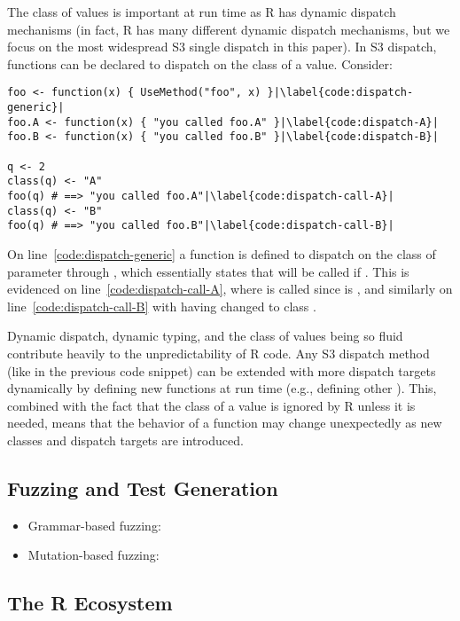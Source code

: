 The class of values is important at run time as R has dynamic dispatch mechanisms (in fact, R has many different dynamic dispatch mechanisms, but we focus on the most widespread S3 single dispatch in this paper). 
In S3 dispatch, functions can be declared to dispatch on the class of a value.
Consider:
\begin{lstlisting}[escapechar=|]
foo <- function(x) { UseMethod("foo", x) }|\label{code:dispatch-generic}|
foo.A <- function(x) { "you called foo.A" }|\label{code:dispatch-A}|
foo.B <- function(x) { "you called foo.B" }|\label{code:dispatch-B}|

q <- 2
class(q) <- "A"
foo(q) # ==> "you called foo.A"|\label{code:dispatch-call-A}|
class(q) <- "B"
foo(q) # ==> "you called foo.B"|\label{code:dispatch-call-B}|
\end{lstlisting}
On line~\ref{code:dispatch-generic} a function  is defined to dispatch on the class of parameter  through , which essentially states that  will be called if .
This is evidenced on line~\ref{code:dispatch-call-A}, where  is called since  is , and similarly on line~\ref{code:dispatch-call-B} with  having changed to class .

Dynamic dispatch, dynamic typing, and the class of values being so fluid contribute heavily to the unpredictability of R code.
Any S3 dispatch method (like  in the previous code snippet) can be extended with more dispatch targets dynamically by defining new functions at run time (e.g., defining other ).
 This, combined with the fact that the class of a value is ignored by R unless it is needed, means that the behavior of a function may change unexpectedly as new classes and dispatch targets are introduced.

\subsection{Fuzzing and Test Generation}

\begin{itemize}
    \item Grammar-based fuzzing: 
    \item Mutation-based fuzzing: 
\end{itemize}

\subsection{The R Ecosystem}

